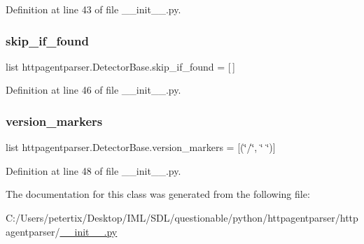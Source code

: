 Definition at line 43 of file \+\_\+\+\_\+init\+\_\+\+\_\+.\+py.

\hypertarget{classhttpagentparser_1_1_detector_base_afcd60add7ac675edd91e88556324beb5}{}\label{classhttpagentparser_1_1_detector_base_afcd60add7ac675edd91e88556324beb5} 
\subsubsection{\texorpdfstring{skip\+\_\+if\+\_\+found}{skip\_if\_found}}
{\footnotesize\ttfamily list httpagentparser.\+Detector\+Base.\+skip\+\_\+if\+\_\+found = \mbox{[}$\,$\mbox{]}\hspace{0.3cm}{\ttfamily [static]}}



Definition at line 46 of file \+\_\+\+\_\+init\+\_\+\+\_\+.\+py.

\hypertarget{classhttpagentparser_1_1_detector_base_a224d3758620f1ad7fe4eb01d93f871ae}{}\label{classhttpagentparser_1_1_detector_base_a224d3758620f1ad7fe4eb01d93f871ae} 
\subsubsection{\texorpdfstring{version\+\_\+markers}{version\_markers}}
{\footnotesize\ttfamily list httpagentparser.\+Detector\+Base.\+version\+\_\+markers = \mbox{[}(\char`\"{}/\char`\"{}, \char`\"{} \char`\"{})\mbox{]}\hspace{0.3cm}{\ttfamily [static]}}



Definition at line 48 of file \+\_\+\+\_\+init\+\_\+\+\_\+.\+py.



The documentation for this class was generated from the following file\+:\begin{DoxyCompactItemize}
\item 
C\+:/\+Users/petertix/\+Desktop/\+I\+M\+L/\+S\+D\+L/questionable/python/httpagentparser/httpagentparser/\hyperlink{____init_____8py}{\+\_\+\+\_\+init\+\_\+\+\_\+.\+py}\end{DoxyCompactItemize}
